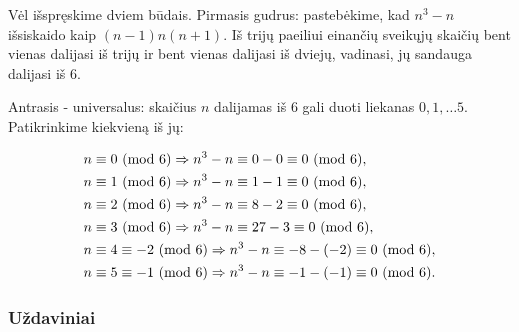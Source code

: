 \begin{sprendimas}
Vėl išspręskime dviem būdais. Pirmasis gudrus: pastebėkime, kad $n^3-n$
išsiskaido kaip $(n-1)n(n+1)$.  Iš trijų paeiliui einančių sveikųjų skaičių
bent vienas dalijasi iš trijų ir bent vienas dalijasi iš dviejų, vadinasi,
jų sandauga dalijasi iš $6$.

Antrasis - universalus: skaičius $n$ dalijamas iš $6$ gali duoti liekanas
$0,1,\dots 5$. Patikrinkime kiekvieną iš jų:

\begin{align*} 
  n&\equiv 0 \ (\text{mod } 6) \Rightarrow n^3 - n \equiv 0-0 \equiv 0 \ (\text{mod } 6),\\ 
  n&\equiv 1 \ (\text{mod } 6) \Rightarrow n^3 - n \equiv 1-1 \equiv 0 \ (\text{mod } 6),\\
  n&\equiv 2 \ (\text{mod } 6) \Rightarrow n^3 - n \equiv 8-2 \equiv 0 \ (\text{mod } 6),\\ 
  n&\equiv 3 \ (\text{mod } 6) \Rightarrow n^3 - n \equiv 27-3 \equiv 0 \ (\text{mod } 6),\\ 
  n&\equiv 4 \equiv -2 \ (\text{mod } 6) \Rightarrow n^3 - n \equiv -8-(-2) \equiv 0
  \ (\text{mod } 6),\\
  n&\equiv 5 \equiv -1 \ (\text{mod } 6) \Rightarrow n^3 - n \equiv -1-(-1) \equiv 0
  \ (\text{mod } 6).\\ 
\end{align*}
\end{sprendimas}

\subsubsection{Uždaviniai} 


